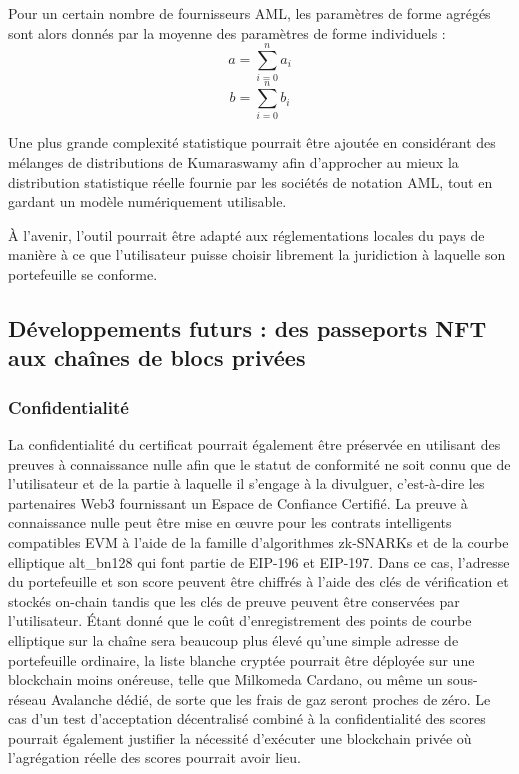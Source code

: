 ﻿\documentclass[a4paper]{article}
\begin{document}
Pour un certain nombre de fournisseurs AML, les paramètres de forme agrégés sont alors donnés par la moyenne des paramètres de forme individuels :
$$a=\sum_{i=0}^na_i$$
$$b=\sum_{i=0}^nb_i$$  

Une plus grande complexité statistique pourrait être ajoutée en considérant des mélanges de distributions de Kumaraswamy afin d'approcher au mieux la distribution statistique réelle fournie par les sociétés de notation AML, tout en gardant un modèle numériquement utilisable.

À l'avenir, l'outil pourrait être adapté aux réglementations locales du pays de manière à ce que l'utilisateur puisse choisir librement la juridiction à laquelle son portefeuille se conforme.

\subsection{Développements futurs : des passeports NFT aux chaînes de blocs privées}
\subsubsection{Confidentialité}
La confidentialité du certificat pourrait également être préservée en utilisant des preuves à connaissance nulle afin que le statut de conformité ne soit connu que de l'utilisateur et de la partie à laquelle il s'engage à la divulguer, c'est-à-dire les partenaires Web3 fournissant un Espace de Confiance Certifié. La preuve à connaissance nulle peut être mise en œuvre pour les contrats intelligents compatibles EVM à l'aide de la famille d'algorithmes zk-SNARKs et de la courbe elliptique alt\_bn128 qui font partie de EIP-196 et EIP-197. Dans ce cas, l'adresse du portefeuille et son score peuvent être chiffrés à l’aide des clés de vérification et stockés on-chain tandis que les clés de preuve peuvent être conservées par l'utilisateur.
Étant donné que le coût d'enregistrement des points de courbe elliptique sur la chaîne sera beaucoup plus élevé qu'une simple adresse de portefeuille ordinaire, la liste blanche cryptée pourrait être déployée sur une blockchain moins onéreuse, telle que Milkomeda Cardano, ou même un sous-réseau Avalanche dédié, de sorte que les frais de gaz seront proches de zéro.
Le cas d'un test d'acceptation décentralisé combiné à la confidentialité des scores pourrait également justifier la nécessité d'exécuter une blockchain privée où l'agrégation réelle des scores pourrait avoir lieu.
\end{document}
